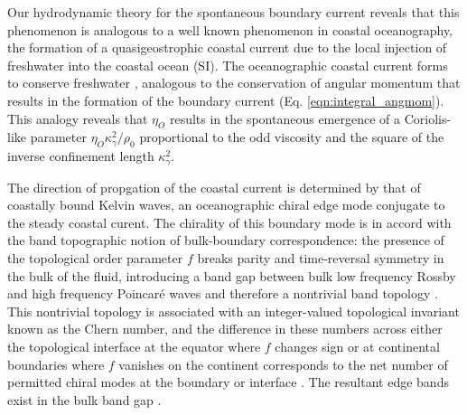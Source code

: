 \documentclass[%
 reprint,
superscriptaddress,
longbibliography,
 amsmath,amssymb,
 prl,
 citeautoscript,
]{revtex4-1}
\begin{document}
Our hydrodynamic theory for the spontaneous boundary current reveals that this phenomenon is analogous to a well known phenomenon in coastal oceanography, the formation of a quasigeostrophic coastal current due to the local injection of freshwater into the coastal ocean (SI). The oceanographic coastal current forms to conserve freshwater \cite{Alex_ARFM, Alex_JFM}, analogous to the conservation of angular momentum that results in the formation of the boundary current (Eq. \ref{eqn:integral_angmom}). This analogy reveals that $\eta_O$ results in the spontaneous emergence of a Coriolis-like parameter $\eta_O \kappa_{\gamma}^2 / \rho_0$ proportional to the odd viscosity and the  square of the inverse confinement length $\kappa_{\gamma}^2$.

The direction of propgation of the coastal current is determined by that of coastally bound Kelvin waves, an oceanographic chiral edge mode \cite{continuum_topology, Kelvin_quantum_Hall} conjugate to the steady coastal curent. The chirality of this boundary mode is in accord with the band topographic notion of bulk-boundary correspondence: the presence of the topological order parameter $f$ breaks parity and time-reversal symmetry in the bulk of the fluid, introducing a band gap between bulk low frequency Rossby and high frequency Poincar\'{e} waves and therefore a nontrivial band topology \cite{science_topology}. This nontrivial topology is associated with an integer-valued topological invariant known as the Chern number, and the difference in these numbers across either the topological interface at the equator where $f$ changes sign or at continental boundaries where $f$  vanishes on the continent corresponds to the net number of permitted chiral modes at the boundary or interface \cite{science_topology, fuchs, boundary_waves, topology_soft_matter, Tauber_JFM}. The resultant edge bands exist in the bulk band gap \cite{fuchs}.
\end{document}
